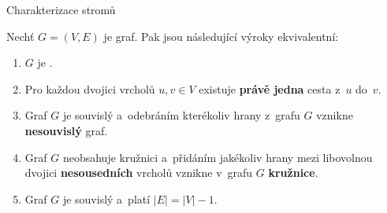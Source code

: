 \documentclass[11pt,professionalfont,aspectratio=43]{beamer}
\begin{document}
    \begin{frame}{Charakterizace stromů}
        \begin{thmblock}
            Nechť $G=(V,E)$ je graf. Pak jsou následující výroky ekvivalentní:
            \begin{enumerate}
                \item $G$ je .
                \item Pro každou dvojici vrcholů $u,v\in V$ existuje \textbf{právě jedna} cesta z~$u$ do~$v$.
                \item Graf $G$ je souvislý a~odebráním kterékoliv hrany z~grafu $G$ vznikne \textbf{nesouvislý} graf.
                \item Graf $G$ neobsahuje kružnici a~přidáním jakékoliv hrany mezi libovolnou dvojici \textbf{nesousedních} vrcholů vznikne v~grafu $G$ \textbf{kružnice}.
                \item Graf $G$ je souvislý a~platí $|E|=|V|-1$.
            \end{enumerate}
        \end{thmblock}
    \end{frame}

\end{document}
